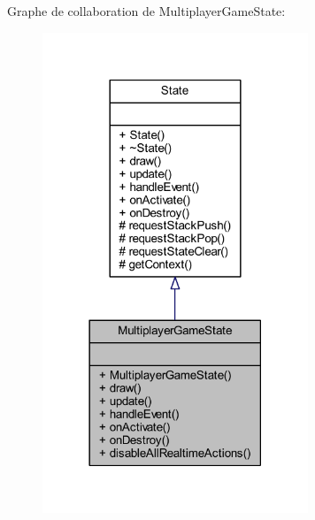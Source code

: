Graphe de collaboration de Multiplayer\+Game\+State\+:\nopagebreak
\begin{figure}[H]
\begin{center}
\leavevmode
\includegraphics[width=225pt]{class_multiplayer_game_state__coll__graph}
\end{center}
\end{figure}
